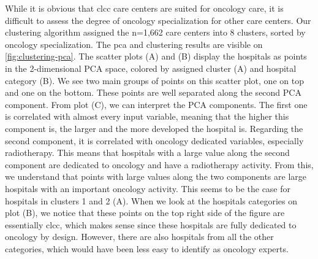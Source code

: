 While it is obvious that \ac{clcc} care centers are suited for oncology care, it
is difficult to assess the degree of oncology specialization for other care
centers. Our clustering algorithm assigned the n=1,662 care centers into 8
clusters, sorted by oncology specialization. The \ac{pca} and clustering results
are visible on \cref{fig:clustering-pca}. The scatter plots (A) and (B) display
the hospitals as points in the 2-dimensional PCA space, colored by assigned
cluster (A) and hospital category (B). We see two main groups of points on this
scatter plot, one on top and one on the bottom. These points are well separated
along the second PCA component. From plot (C), we can interpret the PCA
components. The first one is correlated with almost every input variable,
meaning that the higher this component is, the larger and the more developed the
hospital is. Regarding the second component, it is correlated with oncology
dedicated variables, especially radiotherapy. This means that hospitals with a
large value along the second component are dedicated to oncology and have a
radiotherapy activity. From this, we understand that points with large values
along the two components are large hospitals with an important oncology
activity. This seems to be the case for hospitals in clusters 1 and 2 (A).
When we look at the hospitals categories on plot (B), we notice that these
points on the top right side of the figure are essentially \ac{clcc}, which
makes sense since these hospitals are fully dedicated to oncology by design.
However, there are also hospitals from all the other categories, which would
have been less easy to identify as oncology experts.

